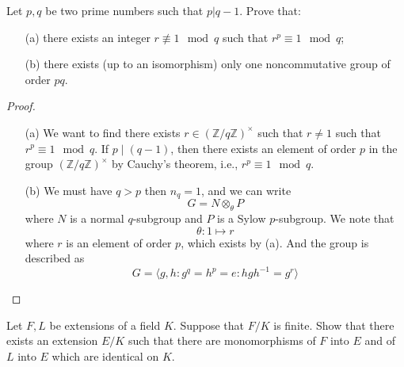 \documentclass[openany]{book}
\newcommand{\Z}{\mathbb{Z}}
\newcommand{\la}{\langle}
\newcommand{\ra}{\rangle}
\begin{document}
\begin{prob}
    Let \(p,q\) be two prime numbers such that \(p|q-1\). Prove that:
    \begin{itemize}
        \item[(a)] there exists an integer \(r\not\equiv 1\mod q\) such that \(r^{p}\equiv 1\mod q\);
        \item[(b)] there exists (up to an isomorphism) only one noncommutative group of order \(pq\).
    \end{itemize}
\end{prob}
\begin{proof}
    \begin{itemize}
        \item[(a)] We want to find there exists $r\in (\Z/q\Z)^\times$ such that $r\neq 1$ such that $r^p\equiv 1\mod q$. If $p\mid(q-1)$, then there exists an element of order $p$ in the group $(\Z/q\Z)^\times$ by Cauchy's theorem, i.e., $r^{p}\equiv 1\mod q$.
        \item[(b)] We must have $q>p$ then $n_q=1$, and we can write 
        \begin{equation*}
            G=N\otimes_\theta P
        \end{equation*}
        where $N$ is a normal $q$-subgroup and $P$ is a Sylow $p$-subgroup. We note that 
        \begin{equation*}
            \theta: 1\mapsto r
        \end{equation*}
        where $r$ is an element of order $p$, which exists by (a). And the group is described as 
        \begin{equation*}
            G=\la g,h: g^q=h^p=e: hgh^{-1}=g^{r}\ra
        \end{equation*}
    \end{itemize}
\end{proof}


\begin{prob}
    Let \(F,L\) be extensions of a field \(K\). Suppose that \(F/K\) is finite. Show that there exists an extension \(E/K\) such that there are monomorphisms of \(F\) into \(E\) and of \(L\) into \(E\) which are identical on \(K\).
\end{prob}
\end{document}
